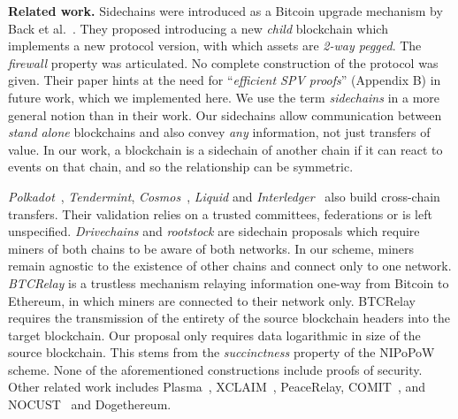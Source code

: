 \noindent\textbf{Related work. }
Sidechains were introduced as a Bitcoin upgrade mechanism by Back et
al.~\cite{sidechains}. They proposed introducing a new \emph{child} blockchain
which implements a new protocol version, with which assets are \emph{2-way
pegged}. The \emph{firewall} property was articulated. No complete construction
of the protocol was given. Their paper hints at the need for ``\emph{efficient
SPV proofs}'' (Appendix B) in future work, which we implemented here. We use the
term \emph{sidechains} in a more general notion than in their work. Our
sidechains allow communication between \emph{stand alone} blockchains and also
convey \emph{any} information, not just transfers of value. In our work, a
blockchain is a sidechain of another chain if it can react to events on that
chain, and so the relationship can be symmetric.

\emph{Polkadot}~\cite{wood2016polkadot}, \emph{Tendermint},
\emph{Cosmos}~\cite{buchman2016tendermint}, \emph{Liquid} and
\emph{Interledger}~\cite{interledger} also build cross-chain transfers. Their
validation relies on a trusted committees, federations or is left unspecified.
\emph{Drivechains} and \emph{rootstock} are sidechain proposals which require
miners of both chains to be aware of both networks. In our scheme, miners remain
agnostic to the existence of other chains and connect only to one network.
\emph{BTCRelay} is a trustless mechanism relaying information one-way from
Bitcoin to Ethereum, in which miners are connected to their network only.
BTCRelay requires the transmission of the entirety of the source blockchain
headers into the target blockchain. Our proposal only requires data logarithmic
in size of the source blockchain. This stems from the \emph{succinctness}
property of the NIPoPoW scheme.
\ifshort\else
None of the aforementioned constructions include
proofs of security.
\fi
Other related work includes Plasma~\cite{poon2017plasma},
XCLAIM~\cite{zamyatinxclaim}, PeaceRelay, COMIT~\cite{comit}, and
NOCUST~\cite{khalil2018nocust} and Dogethereum.
